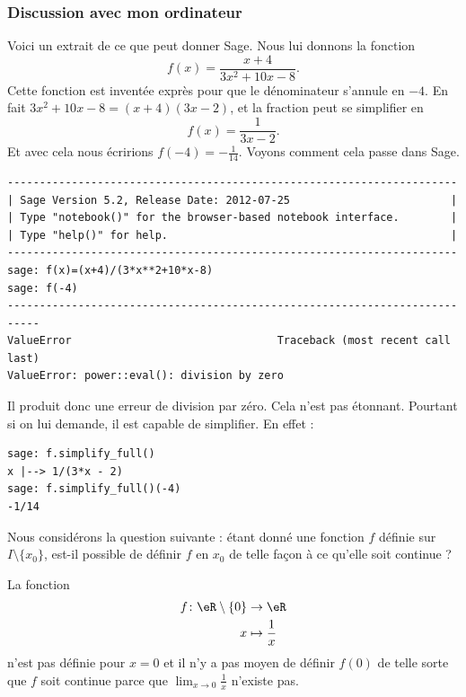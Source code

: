 \subsubsection{Discussion avec mon ordinateur}

Voici un extrait de ce que peut donner Sage. Nous lui donnons la fonction
\begin{equation}    \label{EqyEHTBZ}
	f(x)=\frac{ x+4 }{ 3x^2+10x-8 }.
\end{equation}
Cette fonction est inventée exprès pour que le dénominateur s'annule en \( -4\). En fait \( 3x^2+10x-8=(x+4)(3x-2)\), et la fraction peut se simplifier en
\begin{equation}
	f(x)=\frac{1}{ 3x-2 }.
\end{equation}
Et avec cela nous écririons \( f(-4)=-\frac{1}{ 14 }\). Voyons comment cela passe dans Sage.

\begin{verbatim}
----------------------------------------------------------------------
| Sage Version 5.2, Release Date: 2012-07-25                         |
| Type "notebook()" for the browser-based notebook interface.        |
| Type "help()" for help.                                            |
----------------------------------------------------------------------
sage: f(x)=(x+4)/(3*x**2+10*x-8)
sage: f(-4)
---------------------------------------------------------------------------
ValueError                                Traceback (most recent call last)
ValueError: power::eval(): division by zero
\end{verbatim}
Il produit donc une erreur de division par zéro. Cela n'est pas étonnant. Pourtant si on lui demande, il est capable de simplifier. En effet :
\begin{verbatim}
sage: f.simplify_full()
x |--> 1/(3*x - 2)
sage: f.simplify_full()(-4)
-1/14
\end{verbatim}

Nous considérons la question suivante : étant donné une fonction \( f\) définie sur \( I\setminus\{ x_0 \}\), est-il possible de définir \( f\) en \( x_0\) de telle façon à ce qu'elle soit continue ?

\begin{example}
	La fonction
	\begin{equation}
		\begin{aligned}
			f\colon \eR\setminus\{ 0 \} & \to \eR               \\
			x                           & \mapsto \frac{1}{ x }
		\end{aligned}
	\end{equation}
	n'est pas définie pour \( x=0\) et il n'y a pas moyen de définir \( f(0)\) de telle sorte que \( f\) soit continue parce que \( \lim_{x\to 0} \frac{1}{ x }\) n'existe pas.
\end{example}


